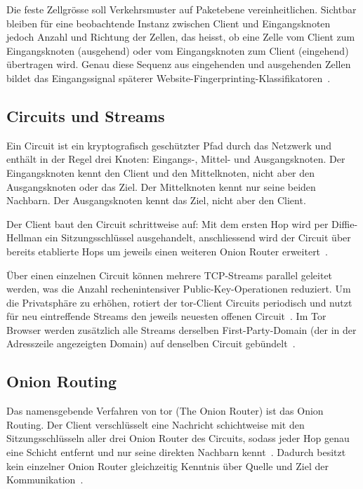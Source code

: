 Die feste Zellgrösse soll Verkehrsmuster auf Paketebene vereinheitlichen.
Sichtbar bleiben für eine beobachtende Instanz zwischen Client und Eingangsknoten jedoch Anzahl und Richtung der Zellen, das heisst, ob eine Zelle vom Client zum Eingangsknoten (ausgehend) oder vom Eingangsknoten zum Client (eingehend) übertragen wird.
Genau diese Sequenz aus eingehenden und ausgehenden Zellen bildet das Eingangssignal späterer Website-Fingerprinting-Klassifikatoren~\cite{jansen2023data}.

\subsection{Circuits und Streams}

Ein Circuit ist ein kryptografisch geschützter Pfad durch das Netzwerk und enthält in der Regel drei Knoten: Eingangs-, Mittel- und Ausgangsknoten.
Der Eingangsknoten kennt den Client und den Mittelknoten, nicht aber den Ausgangsknoten oder das Ziel. Der Mittelknoten kennt nur seine beiden Nachbarn. Der Ausgangsknoten kennt das Ziel, nicht aber den Client.

Der Client baut den Circuit schrittweise auf: Mit dem ersten Hop wird per Diffie-Hellman ein Sitzungsschlüssel ausgehandelt, anschliessend wird der Circuit über bereits etablierte Hops um jeweils einen weiteren Onion Router erweitert~\cite{dingledine2004tor}.

Über einen einzelnen Circuit können mehrere TCP-Streams parallel geleitet werden, was die Anzahl rechenintensiver Public-Key-Operationen reduziert.
Um die Privatsphäre zu erhöhen, rotiert der \gls{tor}-Client Circuits periodisch und nutzt für neu eintreffende Streams den jeweils neuesten offenen Circuit~\cite{dingledine2004tor}.
Im Tor Browser werden zusätzlich alle Streams derselben First-Party-Domain (der in der Adresszeile angezeigten Domain) auf denselben Circuit gebündelt~\cite{jansen2023data}.

\subsection{Onion Routing}

Das namensgebende Verfahren von \gls{tor} (The Onion Router) ist das Onion Routing.
Der Client verschlüsselt eine Nachricht schichtweise mit den Sitzungsschlüsseln aller drei Onion Router des Circuits, sodass jeder Hop genau eine Schicht entfernt und nur seine direkten Nachbarn kennt~\cite{dingledine2004tor}.
Dadurch besitzt kein einzelner Onion Router gleichzeitig Kenntnis über Quelle und Ziel der Kommunikation~\cite{dingledine2004tor}.


